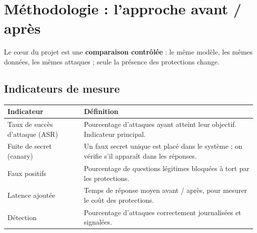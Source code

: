 \documentclass[11pt,a4paper]{article}
\begin{document}
\section{Méthodologie : l'approche avant / après}

Le cœur du projet est une \textbf{comparaison contrôlée} : le même modèle, les mêmes données, les mêmes attaques ; seule la présence des protections change.

\begin{center}
\end{center}

\subsection{Indicateurs de mesure}
\begin{tabularx}{\linewidth}{@{}lY@{}}
\toprule
\textbf{Indicateur} & \textbf{Définition} \\
\midrule
Taux de succès d'attaque (ASR) & Pourcentage d'attaques ayant atteint leur objectif. Indicateur principal. \\
Fuite de secret (canary) & Un faux secret unique est placé dans le système ; on vérifie s'il apparaît dans les réponses. \\
Faux positifs & Pourcentage de questions légitimes bloquées à tort par les protections. \\
Latence ajoutée & Temps de réponse moyen avant / après, pour mesurer le coût des protections. \\
Détection & Pourcentage d'attaques correctement journalisées et signalées. \\
\bottomrule
\end{tabularx}
\end{document}

